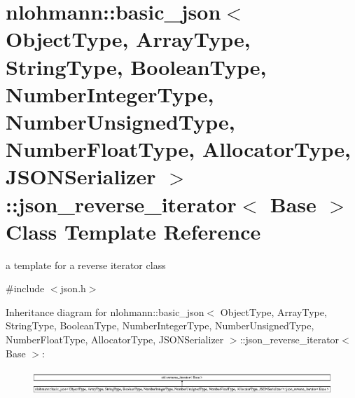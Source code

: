 \hypertarget{classnlohmann_1_1basic__json_1_1json__reverse__iterator}{}\section{nlohmann\+:\+:basic\+\_\+json$<$ Object\+Type, Array\+Type, String\+Type, Boolean\+Type, Number\+Integer\+Type, Number\+Unsigned\+Type, Number\+Float\+Type, Allocator\+Type, J\+S\+O\+N\+Serializer $>$\+:\+:json\+\_\+reverse\+\_\+iterator$<$ Base $>$ Class Template Reference}
\label{classnlohmann_1_1basic__json_1_1json__reverse__iterator}


a template for a reverse iterator class  




{\ttfamily \#include $<$json.\+h$>$}

Inheritance diagram for nlohmann\+:\+:basic\+\_\+json$<$ Object\+Type, Array\+Type, String\+Type, Boolean\+Type, Number\+Integer\+Type, Number\+Unsigned\+Type, Number\+Float\+Type, Allocator\+Type, J\+S\+O\+N\+Serializer $>$\+:\+:json\+\_\+reverse\+\_\+iterator$<$ Base $>$\+:\begin{figure}[H]
\begin{center}
\leavevmode
\includegraphics[height=0.950764cm]{classnlohmann_1_1basic__json_1_1json__reverse__iterator}
\end{center}
\end{figure}
